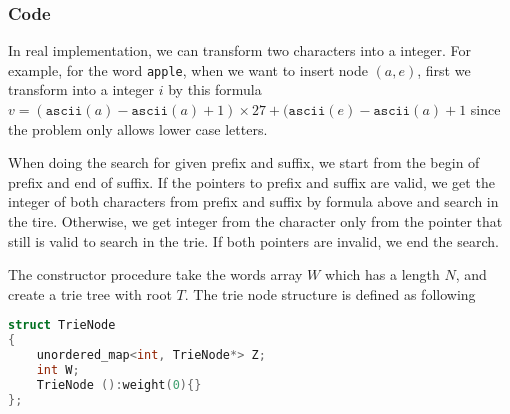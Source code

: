 \documentclass[a4paper,12pt]{article}
\begin{document}
\subsubsection{Code}
In real implementation, we can transform two characters into a integer. For example, for the word \texttt{apple}, when we want to insert node $(a,e)$, first we transform into a integer $i$ by this formula $v=(\texttt{ascii}(a) - \texttt{ascii}(a) + 1) \times 27 + (\texttt{ascii}(e)-\texttt{ascii}(a) + 1$ since the problem only allows lower case letters.
\par
When doing the search for given prefix and suffix, we start from the begin of prefix and end of suffix. If the pointers to prefix and suffix are valid, we get the integer of both characters from prefix and suffix by formula above and search in the tire. Otherwise, we get integer from the character only from the pointer that still is valid to search in the trie. If both pointers are invalid, we end the search.
\par
The constructor procedure take the words array $W$ which has a length $N$, and create a trie tree with root $T$. The trie node structure is defined as following
\begin{lstlisting}[backgroundcolor=\color{blue!80!green!10}, keywordstyle=\bfseries\color{green!40!black}, commentstyle=\itshape\color{purple!40!black},language=C++]
struct TrieNode
{
	unordered_map<int, TrieNode*> Z;
	int W;
	TrieNode ():weight(0){}
};
\end{lstlisting}
\setcounter{algorithm}{0}
\end{document}
